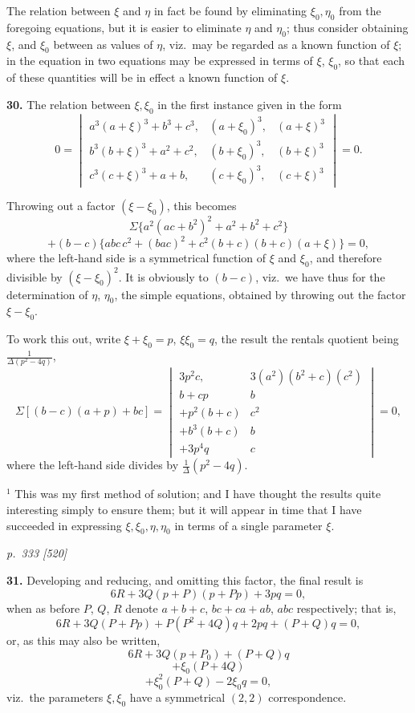 \documentclass[11pt,a4paper]{book}
\begin{document}
The relation between $\xi$ and $\eta$ in fact be found by eliminating $\xi_0, \eta_0$ from the foregoing equations, but it is easier to eliminate $\eta$ and $\eta_0$; thus consider obtaining $\xi$, and $\xi_0$ between as values of $\eta$, viz.\ may be regarded as a known function of $\xi$; in the equation in two equations may be expressed in terms of $\xi$, $\xi_0$, so that each of these quantities will be in effect a known function of $\xi$.

\textbf{30.} The relation between $\xi, \xi_0$ in the first instance given in the form
\[
0 = \begin{vmatrix} a^3(a + \xi)^3 + b^3 + c^3, & (a + \xi_0)^3, & (a + \xi)^3 \\
b^3(b + \xi)^3 + a^2 + c^2, & (b + \xi_0)^3, & (b + \xi)^3 \\
c^3(c + \xi)^3 + a + b, & (c + \xi_0)^3, & (c + \xi)^3 \end{vmatrix} = 0.
\]

Throwing out a factor $(\xi - \xi_0)$, this becomes
\[
\Sigma\{a^2(a c + b^2)^2 + a^2 + b^2 + c^2\}
\]
\[
+ (b - c)\{abc \, c^2 + (b a c)^2 + c^2(b + c)(b + c)(a + \xi)\} = 0,
\]
where the left-hand side is a symmetrical function of $\xi$ and $\xi_0$, and therefore divisible by $(\xi - \xi_0)^2$. It is obviously to $(b - c)$, viz.\ we have thus for the determination of $\eta$, $\eta_0$, the simple equations, obtained by throwing out the factor $\xi - \xi_0$.

To work this out, write $\xi + \xi_0 = p$, $\xi\xi_0 = q$, the result the rentals quotient being $\frac{1}{\Delta(p^2 - 4q)}$,
\[
\Sigma[(b - c)(a + p) + bc] = \begin{vmatrix} 3p^2 c, & 3 (a^2)(b^2 + c)(c^2)\\
b + cp & b\\
+ p^2(b + c) & c^2\\
+ b^3(b + c) & b\\
+ 3p^4 q & c \end{vmatrix} = 0,
\]
where the left-hand side divides by $\tfrac{1}{\Delta}(p^2 - 4q)$.

\footnotesize
$^1$ This was my first method of solution; and I have thought the results quite interesting simply to ensure them; but it will appear in time that I have succeeded in expressing $\xi, \xi_0, \eta, \eta_0$ in terms of a single parameter $\xi$.

\clearpage

\bigskip
\textit{p.~333 [520]}
\smallskip

\textbf{31.} Developing and reducing, and omitting this factor, the final result is
\[
6R + 3Q(p + P)(p + Pp) + 3pq = 0,
\]
when as before $P$, $Q$, $R$ denote $a + b + c$, $bc + ca + ab$, $abc$ respectively; that is,
\[
6R + 3Q(P + Pp) + P(P^2 + 4Q)q + 2pq + (P + Q)q = 0,
\]
or, as this may also be written,
\[
6R + 3Q(p + P_0) + (P + Q)q
\]
\[
+ \xi_0 (P + 4Q)
\]
\[
+ \xi_0^2 (P + Q) - 2\xi_0 q = 0,
\]
viz.\ the parameters $\xi, \xi_0$ have a symmetrical $(2, 2)$ correspondence.
\end{document}
